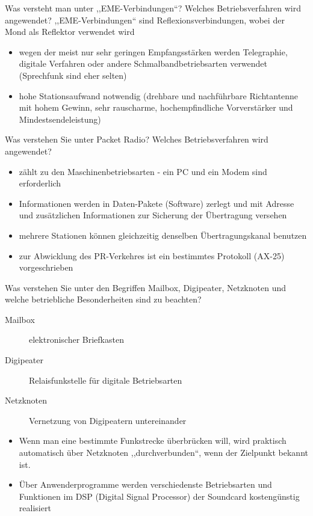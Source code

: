 \documentclass[avery5371,grid,frame,a4paper]{flashcards}
\newcommand{\card}[3]{
  \begin{flashcard}[{\chap} -- #1]{#2}#3\end{flashcard}
}
\begin{document}
\card{60}{Was versteht man unter ,,EME-Verbindungen``? Welches Betriebsverfahren wird angewendet?}{
  \small
  ,,EME-Verbindungen`` sind Reflexionsverbindungen, wobei der Mond als Reflektor verwendet wird
  \begin{itemize}
    \item wegen der meist nur sehr geringen Empfangsstärken werden Telegraphie, digitale Verfahren oder andere Schmalbandbetriebsarten verwendet (Sprechfunk sind eher selten)
    \item hohe Stationsaufwand notwendig (drehbare und nachführbare Richtantenne mit hohem Gewinn, sehr rauscharme, hochempfindliche Vorverstärker und Mindestsendeleistung)
  \end{itemize}
}
\card{61}{Was verstehen Sie unter Packet Radio? Welches Betriebsverfahren wird angewendet?}{
  \small
  \begin{itemize}
    \item zählt zu den Maschinenbetriebsarten - ein PC und ein Modem sind erforderlich
    \item Informationen werden in Daten-Pakete (Software) zerlegt und mit Adresse und zusätzlichen Informationen zur Sicherung der Übertragung versehen
    \item mehrere Stationen können gleichzeitig denselben Übertragungskanal benutzen
    \item zur Abwicklung des PR-Verkehres ist ein bestimmtes Protokoll (AX-25) vorgeschrieben
  \end{itemize}
}
\card{62}{Was verstehen Sie unter den Begriffen Mailbox, Digipeater, Netzknoten und welche betriebliche Besonderheiten sind zu beachten?}{
  \small
  \begin{description}
    \item[Mailbox] elektronischer Briefkasten
    \item[Digipeater] Relaisfunkstelle für digitale Betriebsarten
    \item[Netzknoten] Vernetzung von Digipeatern untereinander
  \end{description}
  \begin{itemize}
    \item Wenn man eine bestimmte Funkstrecke überbrücken will, wird praktisch automatisch über Netzknoten ,,durchverbunden``, wenn der Zielpunkt bekannt ist.
    \item Über Anwenderprogramme werden verschiedenste Betriebsarten und Funktionen im DSP (Digital Signal Processor) der Soundcard kostengünstig realisiert
  \end{itemize}
}
\end{document}
